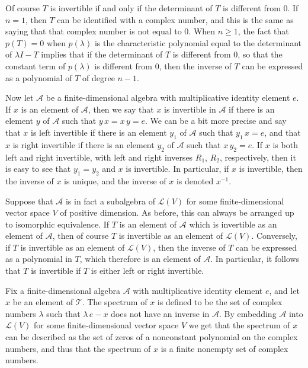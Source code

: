 \documentclass[12pt,leqno,draft]{article}
\begin{document}
	Of course $T$ is invertible if and only if the determinant of
$T$ is different from $0$.  If $n = 1$, then $T$ can be identified
with a complex number, and this is the same as saying that that
complex number is not equal to $0$.  When $n \ge 1$, the fact that
$p(T) = 0$ when $p(\lambda)$ is the characteristic polynomial equal to
the determinant of $\lambda I - T$ implies that if the determinant of
$T$ is different from $0$, so that the constant term of $p(\lambda)$
is different from $0$, then the inverse of $T$ can be expressed as a
polynomial of $T$ of degree $n - 1$.

	Now let $\mathcal{A}$ be a finite-dimensional algebra with
multiplicative identity element $e$.  If $x$ is an element of
$\mathcal{A}$, then we say that $x$ is invertible in $\mathcal{A}$ if
there is an element $y$ of $\mathcal{A}$ such that $y \, x = x \, y =
e$.  We can be a bit more precise and say that $x$ is left invertible
if there is an element $y_1$ of $\mathcal{A}$ such that $y_1 \, x =
e$, and that $x$ is right invertible if there is an element $y_2$ of
$\mathcal{A}$ such that $x \, y_2 = e$.  If $x$ is both left and right
invertible, with left and right inverses $R_1$, $R_2$, respectively,
then it is easy to see that $y_1 = y_2$ and $x$ is invertible.  In
particular, if $x$ is invertible, then the inverse of $x$ is unique,
and the inverse of $x$ is denoted $x^{-1}$.

	Suppose that $\mathcal{A}$ is in fact a subalgebra of
$\mathcal{L}(V)$ for some finite-dimensional vector space $V$ of
positive dimension.  As before, this can always be arranged up to
isomorphic equivalence.  If $T$ is an element of $\mathcal{A}$ which
is invertible as an element of $\mathcal{A}$, then of course $T$ is
invertible as an element of $\mathcal{L}(V)$.  Conversely, if $T$ is
invertible as an element of $\mathcal{L}(V)$, then the inverse of $T$
can be expressed as a polynomial in $T$, which therefore is an element
of $\mathcal{A}$.  In particular, it follows that $T$ is invertible if
$T$ is either left or right invertible.

	Fix a finite-dimensional algebra $\mathcal{A}$ with
multiplicative identity element $e$, and let $x$ be an element of
$\mathcal{T}$.  The spectrum of $x$ is defined to be the set of
complex numbers $\lambda$ such that $\lambda \, e - x$ does not have
an inverse in $\mathcal{A}$.  By embedding $\mathcal{A}$ into
$\mathcal{L}(V)$ for some finite-dimensional vector space $V$ we get
that the spectrum of $x$ can be described as the set of zeros of a
nonconstant polynomial on the complex numbers, and thus that the
spectrum of $x$ is a finite nonempty set of complex numbers.
\end{document}
